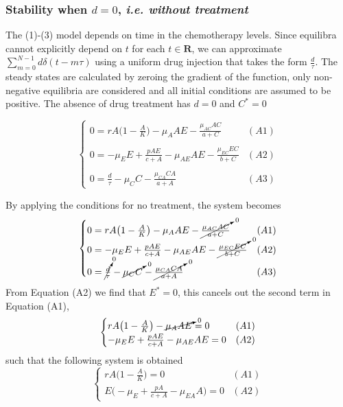\subsubsection{Stability when $d=0$, \textit{i.e. without treatment}}
The (1)-(3) model depends on time in the chemotherapy levels. Since equilibra cannot explicitly depend on $t$ for each $t\in \mathbf{R}$, we can approximate $\sum_{m=0}^{N-1} d\delta(t - m\tau)$ using a uniform drug injection that takes the form $\frac{d}{\tau}$. 
The steady states are calculated by zeroing the gradient of the function, only non-negative equilibria are considered and all initial conditions are assumed to be positive.
The absence of drug treatment has $d=0$ and $C^*=0$

\[
	\begin{cases}
	0 = rA \bigl( 1 - \frac{A}{K} \bigr) - \mu_A AE - \frac{\mu_{AC} AC}{a+C} & (A1)\\ \\ 
	0 = -\mu_E E + \frac{pAE}{c+A} - \mu_{AE} AE - \frac{\mu_{EC} EC}{b+C} & (A2) \\ \\
	0 = \frac{d}{\tau} - \mu_CC - \frac{\mu_{CA} CA}{a+A} & (A3) 
	\end{cases} 
\]

By applying the conditions for no treatment, the system becomes
\[
	\begin{cases}
		0 = rA \bigl( 1 - \frac{A}{K} \bigr) - \mu_A AE - \cancelto{0}{\frac{\mu_{AC} AC}{a+C}} & (A1)\\  
		0 = -\mu_E E + \frac{pAE}{c+A} - \mu_{AE} AE - \cancelto{0}{\frac{\mu_{EC} EC}{b+C}} & (A2) \\ 
		0 = \cancelto{0}{\frac{d}{\tau}} - \cancelto{0}{\mu_CC} - \cancelto{0}{\frac{\mu_{CA} CA}{a+A}} & (A3) 
	\end{cases} 
\]
From Equation (A2) we find that $E^*=0$, this cancels out the second term in Equation (A1),
\[
	\begin{cases}
		rA \bigl( 1 - \frac{A}{K} \bigr) - \cancelto{0}{\mu_A AE} = 0 & (A1)\\ 
		-\mu_E E + \frac{pAE}{c+A} - \mu_{AE} AE  = 0 & (A2) 
	\end{cases} 
\]
such that the following system is obtained
\[ 
	\begin{cases}
		rA \bigl( 1 - \frac{A}{K} \bigr) = 0 & (A1) \\
		E \bigl( -\mu_E + \frac{pA}{c+A} - \mu_{EA}A \bigr) = 0 & (A2) 
	\end{cases}
\]

